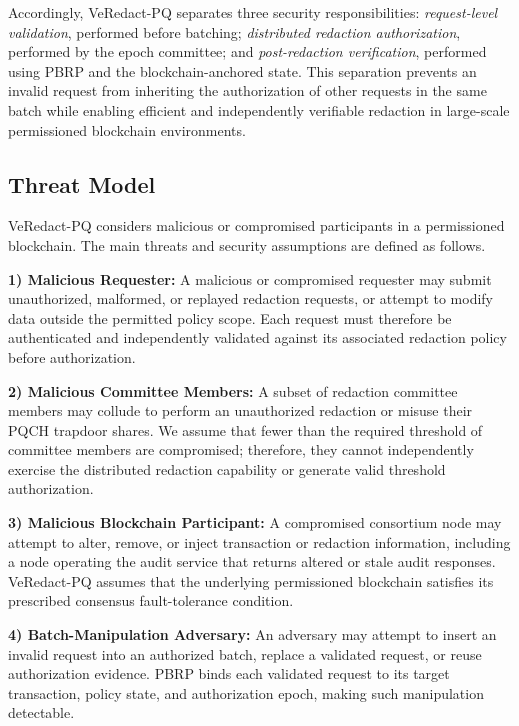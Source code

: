 \documentclass[lettersize,journal]{IEEEtran}
\begin{document}
    Accordingly, VeRedact-PQ separates three security responsibilities:
    \emph{request-level validation}, performed before batching;
    \emph{distributed redaction authorization}, performed by the epoch
    committee; and \emph{post-redaction verification}, performed using
    PBRP and the blockchain-anchored state. This separation prevents an
    invalid request from inheriting the authorization of other requests in
    the same batch while enabling efficient and independently verifiable
    redaction in large-scale permissioned blockchain environments.
    
    
    
    \subsection{Threat Model}
    
    VeRedact-PQ considers malicious or compromised participants in a
    permissioned blockchain. The main threats and security assumptions are
    defined as follows.
    
    \textbf{1) Malicious Requester:}
    A malicious or compromised requester may submit unauthorized,
    malformed, or replayed redaction requests, or attempt to modify data
    outside the permitted policy scope. Each request must therefore be
    authenticated and independently validated against its associated
    redaction policy before authorization.
    
    \textbf{2) Malicious Committee Members:}
    A subset of redaction committee members may collude to perform an
    unauthorized redaction or misuse their PQCH trapdoor shares. We assume
    that fewer than the required threshold of committee members are
    compromised; therefore, they cannot independently exercise the
    distributed redaction capability or generate valid threshold
    authorization.
    
    \textbf{3) Malicious Blockchain Participant:}
    A compromised consortium node may attempt to alter, remove, or inject
    transaction or redaction information{, including a node operating the audit service that returns
    altered or stale audit responses}. VeRedact-PQ assumes that the
    underlying permissioned blockchain satisfies its prescribed consensus
    fault-tolerance condition. 
    
    \textbf{4) Batch-Manipulation Adversary:}
    An adversary may attempt to insert an invalid request into an authorized
    batch, replace a validated request, or reuse authorization evidence.
    PBRP binds each validated request to its target transaction, policy
    state, and authorization epoch, making such manipulation detectable.
    
\end{document}
